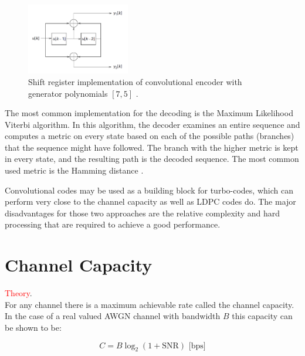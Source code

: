 \documentclass[12pt,a4paper,openright]{report}
\begin{document}
 
  \begin{figure}[H]
   \centering
     \includegraphics[width=0.4\textwidth]{convCode.PNG}
     \caption[Shift register implementation of convolutional encoder]{Shift register implementation of convolutional encoder with generator polynomials $[7,5]$ \cite{Madhow}.}
     \label{fig:convCodeImp}
 \end{figure}  

 The most common implementation for the decoding is the Maximum Likelihood Viterbi algorithm. In this algorithm, the decoder examines an entire sequence and computes a metric on every state based on each of the possible paths (branches) that the sequence might have followed. The branch with the higher metric is kept in every state, and the resulting path is the decoded sequence. The most common used metric is the Hamming distance \cite{ConvCodesTut}.
 
 Convolutional codes may be used as a building block for turbo-codes, which can perform very close to the channel capacity as well as LDPC codes do. The major disadvantages for those two approaches are the relative complexity and hard processing that are required to achieve a good performance. 

\section{Channel Capacity}

\textcolor{red}{Theory}.\\


For any channel there is a maximum achievable rate called the channel capacity. In the case of a real valued AWGN channel with bandwidth \(B\) this capacity can be shown to be:

\begin{equation}
\label{Eq:awgn_capacity} C = B \log_2(1+\text{SNR})\text{                [bps]}
\end{equation}

\end{document}
